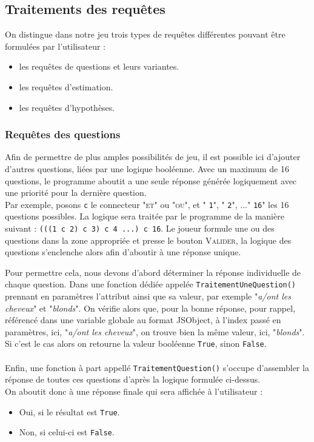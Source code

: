 \documentclass{article}
\begin{document}
  		    \subsection{Traitements des requêtes}
  		        On distingue dans notre jeu trois types de requêtes différentes pouvant être formulées par l'utilisateur :
  		        \begin{itemize}
  		            \item les requêtes de questions et leurs variantes.
  		            \item les requêtes d'estimation.
  		            \item les requêtes d'hypothèses.
  		        \end{itemize}
		    
		        \subsubsection{Requêtes des questions}
                    \par Afin de permettre de plus amples possibilités de jeu, il est possible ici d'ajouter d'autres questions, liées par une logique booléenne. Avec un maximum de 16 questions, le programme aboutit a une seule réponse générée logiquement avec une priorité pour la dernière question.\\
                    Par exemple, posons \texttt{c} le connecteur "\textsc{et}" ou "\textsc{ou}", et " \texttt{1}", " \texttt{2}", ..." \texttt{16}" les 16 questions possibles. La logique sera traitée par le programme de la manière suivant :  \texttt{(((1 c 2) c 3) c 4 ...) c 16}. Le joueur formule une ou des questions dans la zone appropriée et presse le bouton \textsc{Valider}, la logique des questions s'enclenche alors afin d'aboutir à une réponse unique.\\
                    \par Pour permettre cela, nous devons d'abord déterminer la réponse individuelle de chaque question. Dans une fonction dédiée appelée \texttt{TraitementUneQuestion()} prennant en paramètres l'attribut ainsi que sa valeur, par exemple "\textit{a/ont les cheveux}" et "\textit{blonds}". On vérifie alors que, pour la bonne réponse, pour rappel, référencé dans une variable globale au format JSObject, à l'index passé en paramètres, ici, "\textit{a/ont les cheveux}", on trouve bien la même valeur, ici, "\textit{blonds}". Si c'est le cas alors on retourne la valeur booléenne \texttt{True}, sinon \texttt{False}.\\\\
                    Enfin, une fonction à part appellé \texttt{TraitementQuestion()} s'occupe d'assembler la réponse de toutes ces questions d'après la logique formulée ci-dessus. \\
                    On aboutit donc à une réponse finale qui sera affichée à l'utilisateur : 
                    \begin{itemize}
                        \item Oui, si le résultat est \texttt{True}.
                        \item Non, si celui-ci est \texttt{False}.
                    \end{itemize}
		
\end{document}
